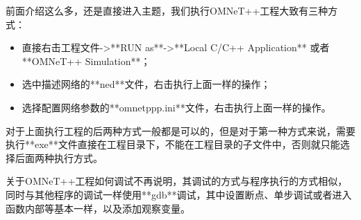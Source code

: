 前面介绍这么多，还是直接进入主题，我们执行OMNeT++工程大致有三种方式：
\begin{itemize}
	\item 直接右击工程文件->**RUN as**->**Local C/C++ Application** 或者**OMNeT++ Simulation**；
	\item 选中描述网络的**ned**文件，右击执行上面一样的操作；
	\item 选择配置网络参数的**omnetppp.ini**文件，右击执行上面一样的操作。
\end{itemize}

对于上面执行工程的后两种方式一般都是可以的，但是对于第一种方式来说，需要执行**exe**文件直接在工程目录下，不能在工程目录的子文件中，否则就只能选择后面两种执行方式。

关于OMNeT++工程如何调试不再说明，其调试的方式与程序执行的方式相似，同时与其他程序的调试一样使用**gdb**调试，其中设置断点、单步调试或者进入函数内部等基本一样，以及添加观察变量。














